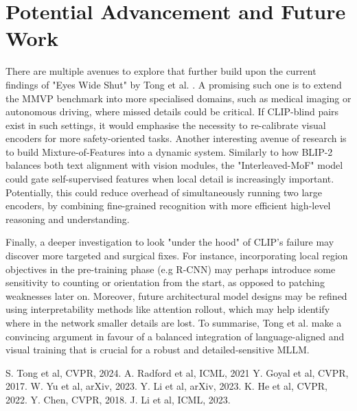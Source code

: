 \documentclass[11pt]{article}
\begin{document}
\section*{Potential Advancement and Future Work}

There are multiple avenues to explore that further build upon the current findings of "Eyes Wide Shut" by Tong et al. \cite{Tong2024CVPR}. A promising such one is to extend the MMVP benchmark into more specialised domains, such as medical imaging or autonomous driving, where missed details could be critical. If CLIP-blind pairs exist in such settings, it would emphasise the necessity to re-calibrate visual encoders for more safety-oriented tasks.
Another interesting avenue of research is to build Mixture-of-Features into a dynamic system. Similarly to how BLIP-2 \cite{Li2023ICML_BLIP2} balances both text alignment with vision modules, the "Interleaved-MoF" model could gate self-supervised features when local detail is increasingly important. Potentially, this could reduce overhead of simultaneously running two large encoders, by combining fine-grained recognition with more efficient high-level reasoning and understanding.

Finally, a deeper investigation to look "under the hood" of CLIP's failure may discover more targeted and surgical fixes. For instance, incorporating local region objectives in the pre-training phase (e.g R-CNN) may perhaps introduce some sensitivity to counting or orientation from the start, as opposed to patching weaknesses later on.
Moreover, future architectural model designs may be refined using interpretability methods like attention rollout, which may help identify where in the network smaller details are lost.
To summarise, Tong et al. make a convincing argument in favour of a balanced integration of language-aligned and visual training that is crucial for a robust and detailed-sensitive MLLM.

\begin{multicols}{3}
\begin{thebibliography}{9}
    \setlength{\itemsep}{0em}  
    \setlength{\parskip}{0pt}     
     S. Tong et al, CVPR, 2024.
     A. Radford et al, ICML, 2021
     Y. Goyal et al, CVPR, 2017.
     W. Yu et al, arXiv, 2023.
     Y. Li et al, arXiv, 2023.
     K. He et al, CVPR, 2022.
     Y. Chen, CVPR, 2018.
     J. Li et al, ICML, 2023.
\end{thebibliography}
\end{multicols}
\end{document}
